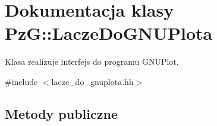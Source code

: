 \hypertarget{class_pz_g_1_1_lacze_do_g_n_u_plota}{}\section{Dokumentacja klasy PzG\+:\+:Lacze\+Do\+G\+N\+U\+Plota}
\label{class_pz_g_1_1_lacze_do_g_n_u_plota}


Klasa realizuje interfejs do programu G\+N\+U\+Plot.  




{\ttfamily \#include $<$lacze\+\_\+do\+\_\+gnuplota.\+hh$>$}

\subsection*{Metody publiczne}
